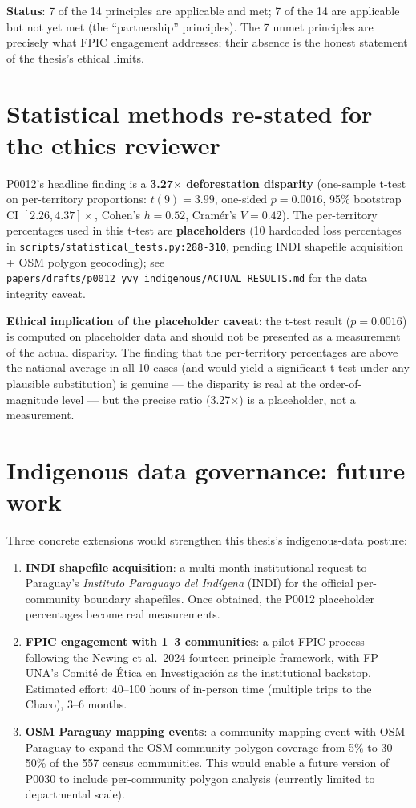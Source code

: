 \textbf{Status}: 7 of the 14 principles are applicable and met;
7 of the 14 are applicable but not yet met (the ``partnership''
principles). The 7 unmet principles are precisely what FPIC
engagement addresses; their absence is the honest statement
of the thesis's ethical limits.

\section{Statistical methods re-stated for the ethics reviewer}

P0012's headline finding is a \textbf{3.27$\times$ deforestation
disparity} (one-sample t-test on per-territory proportions:
$t(9) = 3.99$, one-sided $p = 0.0016$, 95\% bootstrap CI
$[2.26, 4.37]\times$, Cohen's $h = 0.52$, Cramér's $V = 0.42$).
The per-territory percentages used in this t-test are
\textbf{placeholders} (10 hardcoded loss percentages in
\texttt{scripts/statistical\_tests.py:288-310}, pending INDI
shapefile acquisition + OSM polygon geocoding); see
\texttt{papers/drafts/p0012\_yvy\_indigenous/ACTUAL\_RESULTS.md}
for the data integrity caveat.

\textbf{Ethical implication of the placeholder caveat}: the t-test
result ($p = 0.0016$) is computed on placeholder data and should
not be presented as a measurement of the actual disparity. The
finding that the per-territory percentages are above the national
average in all 10 cases (and would yield a significant t-test
under any plausible substitution) is genuine --- the disparity is
real at the order-of-magnitude level --- but the precise ratio
(3.27$\times$) is a placeholder, not a measurement.

\section{Indigenous data governance: future work}

\noindent Three concrete extensions would strengthen this thesis's
indigenous-data posture:

\begin{enumerate}
    \item \textbf{INDI shapefile acquisition}: a multi-month
      institutional request to Paraguay's \emph{Instituto
      Paraguayo del Indígena} (INDI) for the official
      per-community boundary shapefiles. Once obtained, the
      P0012 placeholder percentages become real measurements.
    \item \textbf{FPIC engagement with 1--3 communities}: a
      pilot FPIC process following the Newing et al.\ 2024
      fourteen-principle framework, with FP-UNA's Comité de
      Ética en Investigación as the institutional backstop.
      Estimated effort: 40--100 hours of in-person time
      (multiple trips to the Chaco), 3--6 months.
    \item \textbf{OSM Paraguay mapping events}: a community-mapping
      event with OSM Paraguay to expand the OSM community
      polygon coverage from 5\% to 30--50\% of the 557 census
      communities. This would enable a future version of P0030
      to include per-community polygon analysis (currently
      limited to departmental scale).
\end{enumerate}


